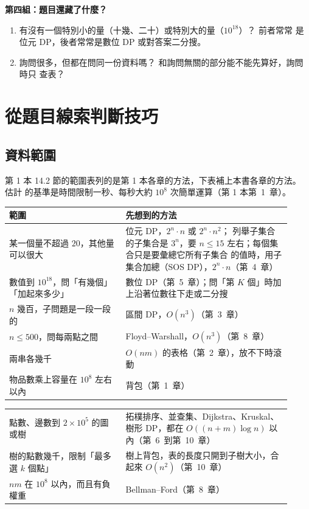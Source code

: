 \textbf{第四組：題目還藏了什麼？}

\begin{enumerate}[resume]
\item 有沒有一個特別小的量（十幾、二十）或特別大的量（$10^{18}$）？ 前者常常
是位元 DP，後者常常是數位 DP 或對答案二分搜。
\item 詢問很多，但都在問同一份資料嗎？ 和詢問無關的部分能不能先算好，詢問時只
查表？
\end{enumerate}

\section{從題目線索判斷技巧}
\label{sec:cap-clues}

\subsection{資料範圍}

第 1 本 14.2 節的範圍表列的是第 1 本各章的方法，下表補上本書各章的方法。 估計
的基準是時間限制一秒、每秒大約 $10^8$ 次簡單運算（第 1 本第~1~章）。

\begin{center}
\begin{tabular}{p{0.38\linewidth}p{0.54\linewidth}}
\toprule
範圍 & 先想到的方法 \\
\midrule
某一個量不超過 $20$，其他量可以很大 & 位元 DP，$2^n \cdot n$ 或 $2^n \cdot n^2$；
列舉子集合的子集合是 $3^n$，要 $n \le 15$ 左右；每個集合只是要彙總它所有子集合
的值時，用子集合加總（SOS DP），$2^n \cdot n$（第~4~章） \\
數值到 $10^{18}$，問「有幾個」「加起來多少」 & 數位 DP（第~5~章）；問「第 $K$
個」時加上沿著位數往下走或二分搜 \\
$n$ 幾百，子問題是一段一段的 & 區間 DP，$O(n^3)$（第~3~章） \\
$n \le 500$，問每兩點之間 & Floyd--Warshall，$O(n^3)$（第~8~章） \\
兩串各幾千 & $O(nm)$ 的表格（第~2~章），放不下時滾動 \\
物品數乘上容量在 $10^8$ 左右以內 & 背包（第~1~章） \\
\end{tabular}

\begin{tabular}{p{0.38\linewidth}p{0.54\linewidth}}
點數、邊數到 $2 \times 10^5$ 的圖或樹 & 拓樸排序、並查集、Dijkstra、Kruskal、樹形
DP，都在 $O((n + m) \log n)$ 以內（第~6~到第~10~章） \\
樹的點數幾千，限制「最多選 $k$ 個點」 & 樹上背包，表的長度只開到子樹大小，合起來
$O(n^2)$（第~10~章） \\
$nm$ 在 $10^8$ 以內，而且有負權重 & Bellman--Ford（第~8~章） \\
\bottomrule
\end{tabular}
\end{center}


